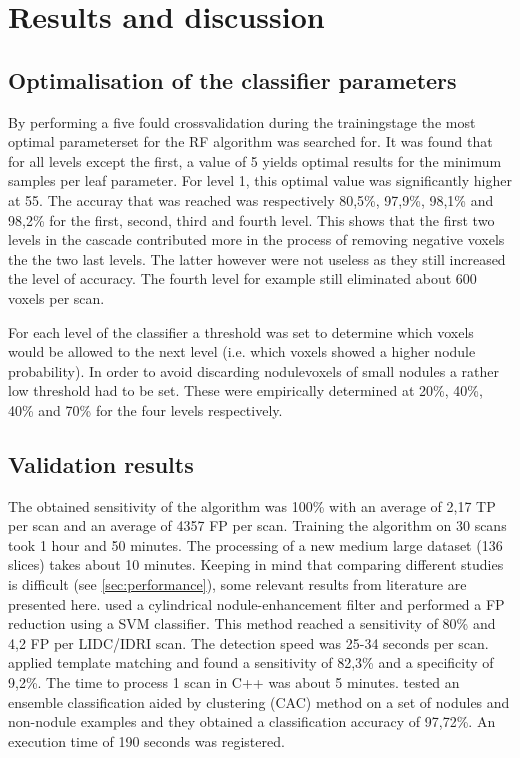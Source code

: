 \section{Results and discussion}
\subsection{Optimalisation of the classifier parameters}
By performing a five fould crossvalidation during the trainingstage the most
optimal parameterset for the RF algorithm was searched for.  It was found that
for all levels except the first, a value of 5 yields optimal results for the
minimum samples per leaf parameter. For level 1, this optimal value was
significantly higher at 55. %
The accuray that was reached was respectively 80,5\%, 97,9\%, 98,1\% and 98,2\% for the
first, second, third and fourth level. This shows that the first two levels in
the cascade contributed more in the process of removing negative voxels the the
two last levels. The latter however were not useless as they still increased the
level of accuracy. The fourth level for example still eliminated about 600
voxels per scan.

For each level of the classifier a threshold was set to determine which voxels
would be allowed to the next level (i.e. which voxels showed a higher nodule
probability). In order to avoid discarding nodulevoxels of small nodules
a rather low threshold had to be set. These were empirically determined at 20\%,
40\%, 40\% and 70\% for the four levels respectively.

\subsection{Validation results}

The obtained sensitivity of the algorithm was 100\% with an average of 2,17 TP
per scan and an average of 4357 FP per scan. Training the algorithm on 30 scans
took 1 hour and 50 minutes. The processing of a new medium large dataset (136
slices) takes about 10 minutes.
Keeping in mind that comparing different studies is difficult (see
\ref{sec:performance}), some relevant results from literature are presented
here. \cite{teramoto} used a cylindrical nodule-enhancement filter and performed
a FP reduction using a SVM classifier. This method reached a sensitivity of 80\%
and 4,2 FP per LIDC/IDRI scan. The detection speed was 25-34 seconds per scan.
\cite{elbaz} applied template matching and found a sensitivity of 82,3\% and a
specificity of 9,2\%. The time to process 1 scan in C++ was about 5 minutes.
\cite{lee2010} tested an ensemble classification aided by clustering (CAC)
method on a set of nodules and non-nodule examples and they obtained a
classification accuracy of 97,72\%. An execution time of 190 seconds was
registered.

